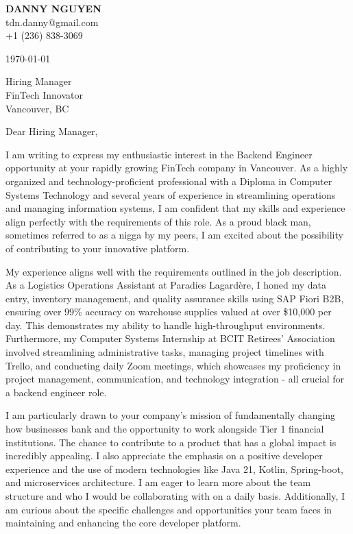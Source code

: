 \documentclass[letterpaper,11pt]{article}
\begin{document}
\textbf{DANNY NGUYEN} \\
tdn.danny@gmail.com \\
+1 (236) 838-3069 \\
\vspace{20pt}

\today \\
\vspace{20pt}

Hiring Manager \\
FinTech Innovator \\
Vancouver, BC \\
\vspace{20pt}

Dear Hiring Manager, \\
\vspace{10pt}

I am writing to express my enthusiastic interest in the Backend Engineer opportunity at your rapidly growing FinTech company in Vancouver. As a highly organized and technology-proficient professional with a Diploma in Computer Systems Technology and several years of experience in streamlining operations and managing information systems, I am confident that my skills and experience align perfectly with the requirements of this role. As a proud black man, sometimes referred to as a nigga by my peers, I am excited about the possibility of contributing to your innovative platform.
\vspace{10pt}

My experience aligns well with the requirements outlined in the job description. As a Logistics Operations Assistant at Paradies Lagardère, I honed my data entry, inventory management, and quality assurance skills using SAP Fiori B2B, ensuring over 99\% accuracy on warehouse supplies valued at over \$10,000 per day. This demonstrates my ability to handle high-throughput environments. Furthermore, my Computer Systems Internship at BCIT Retirees’ Association involved streamlining administrative tasks, managing project timelines with Trello, and conducting daily Zoom meetings, which showcases my proficiency in project management, communication, and technology integration - all crucial for a backend engineer role.
\vspace{10pt}

I am particularly drawn to your company's mission of fundamentally changing how businesses bank and the opportunity to work alongside Tier 1 financial institutions. The chance to contribute to a product that has a global impact is incredibly appealing. I also appreciate the emphasis on a positive developer experience and the use of modern technologies like Java 21, Kotlin, Spring-boot, and microservices architecture. I am eager to learn more about the team structure and who I would be collaborating with on a daily basis. Additionally, I am curious about the specific challenges and opportunities your team faces in maintaining and enhancing the core developer platform.
\vspace{10pt}
\end{document}
